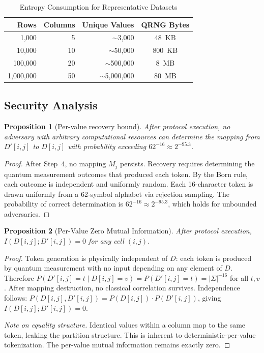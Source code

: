 \documentclass[acmsmall,screen,review,anonymous]{acmart}
\newtheorem{proposition}{Proposition}
\begin{document}
\begin{table}[t]
\caption{Entropy Consumption for Representative Datasets}
\label{tab:entropy_budget}
\begin{center}
\begin{tabular}{@{}rrrc@{}}
\toprule
\textbf{Rows} & \textbf{Columns} & \textbf{Unique Values} & \textbf{QRNG Bytes} \\
\midrule
1,000 & 5 & ${\sim}$3,000 & 48~KB \\
10,000 & 10 & ${\sim}$50,000 & 800~KB \\
100,000 & 20 & ${\sim}$500,000 & 8~MB \\
1,000,000 & 50 & ${\sim}$5,000,000 & 80~MB \\
\bottomrule
\end{tabular}
\end{center}
\end{table}

\subsection{Security Analysis}

\begin{proposition}[Per-value recovery bound]
\label{prop:pervalue}
After protocol execution, no adversary with arbitrary computational resources can determine the mapping from $D'[i,j]$ to $D[i,j]$ with probability exceeding $62^{-16} \approx 2^{-95.3}$.
\end{proposition}

\begin{proof}
After Step~4, no mapping $M_j$ persists. Recovery requires determining the quantum measurement outcomes that produced each token. By the Born rule, each outcome is independent and uniformly random. Each 16-character token is drawn uniformly from a 62-symbol alphabet via rejection sampling. The probability of correct determination is $62^{-16} \approx 2^{-95.3}$, which holds for unbounded adversaries.
\end{proof}

\begin{proposition}[Per-Value Zero Mutual Information]
\label{prop:mi}
After protocol execution, $I(D[i,j]; D'[i,j]) = 0$ for any cell $(i,j)$.
\end{proposition}

\begin{proof}
Token generation is physically independent of $D$: each token is produced by quantum measurement with no input depending on any element of $D$. Therefore $P(D'[i,j]{=}t \mid D[i,j]{=}v) = P(D'[i,j]{=}t) = |\Sigma|^{-16}$ for all $t, v$. After mapping destruction, no classical correlation survives. Independence follows: $P(D[i,j], D'[i,j]) = P(D[i,j]) \cdot P(D'[i,j])$, giving $I(D[i,j]; D'[i,j]) = 0$.

\emph{Note on equality structure.} Identical values within a column map to the same token, leaking the partition structure. This is inherent to deterministic-per-value tokenization. The per-value mutual information remains exactly zero.
\end{proof}
\end{document}
